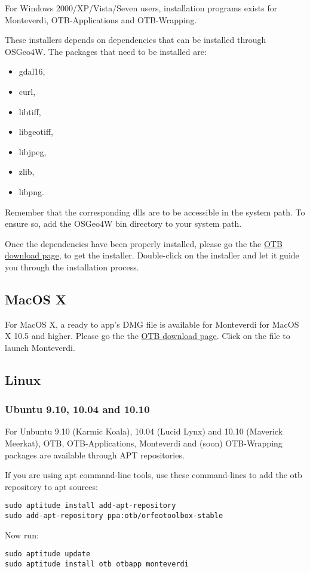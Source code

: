 For Windows 2000/XP/Vista/Seven users, installation programs exists for Monteverdi, 
OTB-Applications and OTB-Wrapping. 

These installers depends on dependencies that can be installed through OSGeo4W. The packages that
need to be installed are:
\begin{itemize}
\item gdal16,
\item curl, 
\item libtiff,
\item libgeotiff,
\item libjpeg,
\item zlib, 
\item libpng.
\end{itemize}
Remember that the corresponding dlls are to be accessible in the system path. To ensure so, add
the OSGeo4W bin directory to your system path.

 Once the dependencies have been properly installed, please go the the 
\href{http://sourceforge.net/projects/orfeo-toolbox/}{OTB download page}, to
get the installer. Double-click on the installer and let it guide you through the 
installation process.

\subsection{MacOS X}
\label{ssec:mac_binaries}

For MacOS X, a ready to app's DMG file is available for Monteverdi for MacOS X 10.5 and higher. 
Please go the the \href{http://sourceforge.net/projects/orfeo-toolbox/}{OTB download page}.
Click on the file to launch Monteverdi.

\subsection{Linux}

\subsubsection{Ubuntu 9.10, 10.04 and 10.10}
\label{ssec:ubuntu_binaries}
For Unbuntu 9.10 (Karmic Koala), 10.04 (Lucid Lynx) and 10.10 (Maverick Meerkat), OTB, 
OTB-Applications, Monteverdi and (soon) OTB-Wrapping packages are available through APT repositories.

If you are using apt command-line tools, use these command-lines to add the otb repository to apt sources:
\begin{verbatim}
sudo aptitude install add-apt-repository 
sudo add-apt-repository ppa:otb/orfeotoolbox-stable
\end{verbatim}
Now run:
\begin{verbatim}
sudo aptitude update
sudo aptitude install otb otbapp monteverdi
\end{verbatim}

